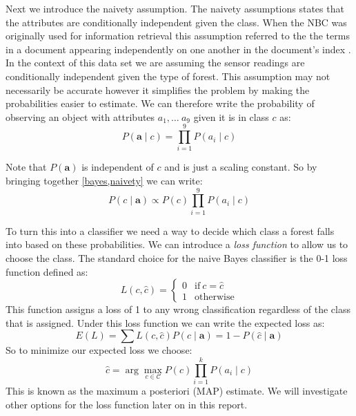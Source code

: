 Next we introduce the naivety assumption.
The naivety assumptions states that the attributes are conditionally independent given the class.
When the NBC was originally used for information retrieval this assumption referred to the the terms in a document appearing independently on one another in the document's index \cite{Maron60}.
In the context of this data set we are assuming the sensor readings are conditionally independent given the type of forest.
This assumption may not necessarily be accurate however it simplifies the problem by making the probabilities easier to estimate.
We can therefore write the probability of observing an object with attributes $a_1, \dots\ a_9$ given it is in class $c$ as:
\begin{equation} \label{naivety}
	P(\mathbf{a} \mid c) = \prod_{i=1}^9 P(a_i \mid c)
\end{equation}

Note that $P(\mathbf{a})$ is independent of $c$ and is just a scaling constant.
So by bringing together \cref{bayes,naivety} we can write:
\begin{equation}
	P(c \mid \mathbf{a}) \propto P(c)\prod_{i=1}^{9}P(a_i \mid c)
\end{equation}

To turn this into a classifier we need a way to decide which class a forest falls into based on these probabilities.
We can introduce a \textit{loss function} to allow us to choose the class.
The standard choice for the naive Bayes classifier is the 0-1 loss function \cite{Need} defined as:
\begin{equation}\label{0-1_loss_function}
	L(c, \hat{c}) = 
	\begin{cases}
		0 & \text{if}\ c = \hat{c} \\
		1 & \text{otherwise}
	\end{cases}
\end{equation}
This function assigns a loss of 1 to any wrong classification regardless of the class that is assigned. 
Under this loss function we can write the expected loss as:
\begin{equation}
	E(L) = \sum L(c, \hat{c})P(c \mid \mathbf{a}) = 1 - P(\hat{c} \mid \mathbf{a})
\end{equation}
So to minimize our expected loss we choose:
\begin{equation} \label{map_estimate}
	\hat c = \arg\max_{c \in \mathcal{C}} P(c)\prod_{i=1}^{k}P(a_i \mid c)
\end{equation}
This is known as the maximum a posteriori (MAP) estimate.
We will investigate other options for the loss function later on in this report.

